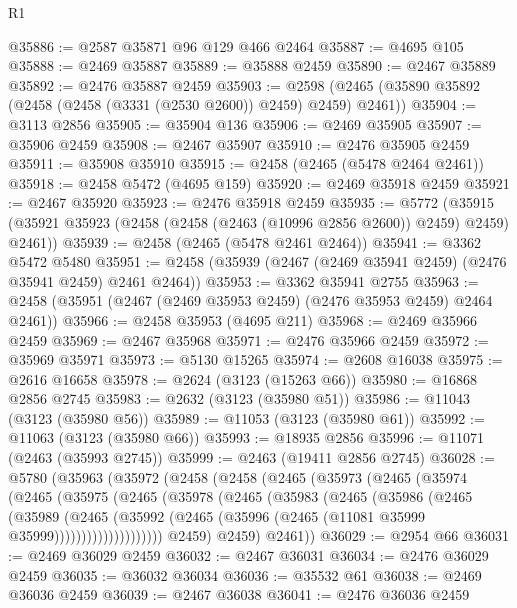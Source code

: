\begin{lexlean}{R1}
\begin{coremodule}
@35886 := @2587 @35871 @96 @129 @466 @2464
@35887 := @4695 @105
@35888 := @2469 @35887
@35889 := @35888 @2459
@35890 := @2467 @35889
@35892 := @2476 @35887 @2459
@35903 := @2598 (@2465 (@35890 @35892 (@2458 (@2458 (@3331 (@2530 @2600)) @2459) @2459) @2461))
@35904 := @3113 @2856
@35905 := @35904 @136
@35906 := @2469 @35905
@35907 := @35906 @2459
@35908 := @2467 @35907
@35910 := @2476 @35905 @2459
@35911 := @35908 @35910
@35915 := @2458 (@2465 (@5478 @2464 @2461))
@35918 := @2458 @5472 (@4695 @159)
@35920 := @2469 @35918 @2459
@35921 := @2467 @35920
@35923 := @2476 @35918 @2459
@35935 := @5772
    (@35915 (@35921 @35923 (@2458 (@2458 (@2463 (@10996 @2856 @2600)) @2459) @2459) @2461))
@35939 := @2458 (@2465 (@5478 @2461 @2464))
@35941 := @3362 @5472 @5480
@35951 := @2458 (@35939 (@2467 (@2469 @35941 @2459) (@2476 @35941 @2459) @2461 @2464))
@35953 := @3362 @35941 @2755
@35963 := @2458 (@35951 (@2467 (@2469 @35953 @2459) (@2476 @35953 @2459) @2464 @2461))
@35966 := @2458 @35953 (@4695 @211)
@35968 := @2469 @35966 @2459
@35969 := @2467 @35968
@35971 := @2476 @35966 @2459
@35972 := @35969 @35971
@35973 := @5130 @15265
@35974 := @2608 @16038
@35975 := @2616 @16658
@35978 := @2624 (@3123 (@15263 @66))
@35980 := @16868 @2856 @2745
@35983 := @2632 (@3123 (@35980 @51))
@35986 := @11043 (@3123 (@35980 @56))
@35989 := @11053 (@3123 (@35980 @61))
@35992 := @11063 (@3123 (@35980 @66))
@35993 := @18935 @2856
@35996 := @11071 (@2463 (@35993 @2745))
@35999 := @2463 (@19411 @2856 @2745)
@36028 := @5780
    (@35963
      (@35972
        (@2458
          (@2458
            (@2465
              (@35973
                (@2465
                  (@35974
                    (@2465
                      (@35975
                        (@2465
                          (@35978
                            (@2465
                              (@35983
                                (@2465
                                  (@35986
                                    (@2465
                                      (@35989
                                        (@2465
                                          (@35992
                                            (@2465
                                              (@35996
                                                (@2465 (@11081 @35999 @35999))))))))))))))))))))
            @2459)
          @2459)
        @2461))
@36029 := @2954 @66
@36031 := @2469 @36029 @2459
@36032 := @2467 @36031
@36034 := @2476 @36029 @2459
@36035 := @36032 @36034
@36036 := @35532 @61
@36038 := @2469 @36036 @2459
@36039 := @2467 @36038
@36041 := @2476 @36036 @2459

\end{coremodule}
\end{lexlean}
